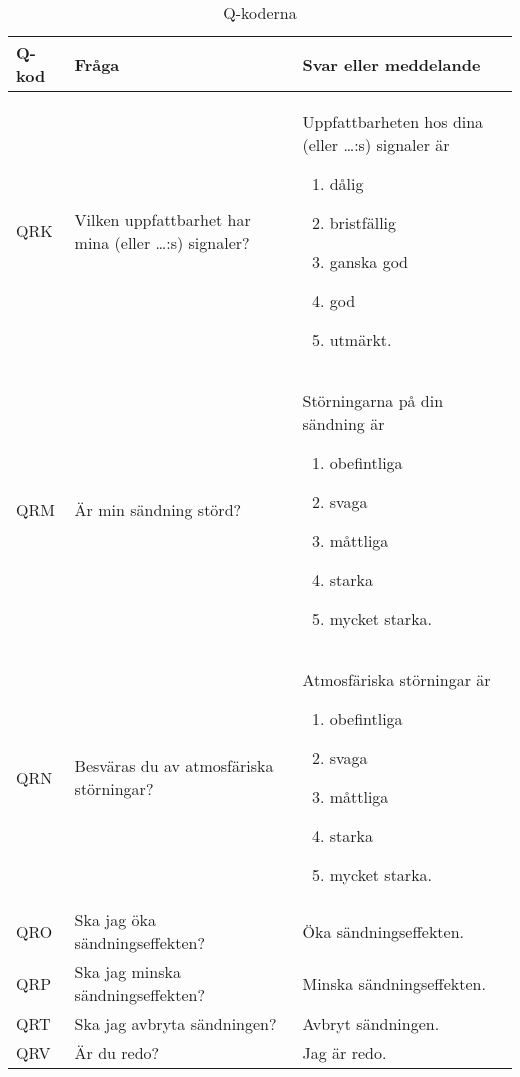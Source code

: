 \begin{table}
  \label{tab:q-kod}
  \caption{Q-koderna}
  \begin{tabular}{lp{6cm}p{6cm}}
    Q-kod & Fråga & Svar eller meddelande \\
    \hline
    QRK &
    Vilken uppfattbarhet har mina (eller \dots:s) signaler?
    &
    Uppfattbarheten hos dina (eller \dots:s) signaler är
    \vspace{-\topsep}
    \begin{enumerate}[noitemsep]
    \item dålig
    \item bristfällig
    \item ganska god
    \item god
    \item utmärkt.
    \end{enumerate} \\
    QRM &
    Är min sändning störd?
    &
    Störningarna på din sändning är
    \vspace{-\topsep}
    \begin{enumerate}[noitemsep]
    \item obefintliga
    \item svaga
    \item måttliga
    \item starka
    \item mycket starka.
    \end{enumerate} \\
    QRN
    &
    Besväras du av atmosfäriska störningar?
    &
    Atmosfäriska störningar är
    \vspace{-\topsep}
    \begin{enumerate}[noitemsep]
    \item obefintliga
    \item svaga
    \item måttliga
    \item starka
    \item mycket starka.
    \end{enumerate} \\
    QRO
    &
    Ska jag öka sändningseffekten?
    &
    Öka sändningseffekten.
    \\
    QRP
    &
    Ska jag minska sändningseffekten?
    &
    Minska sändningseffekten.
    \\
    QRT
    &
    Ska jag avbryta sändningen?
    &
    Avbryt sändningen.
    \\
    QRV
    &
    Är du redo?
    &
    Jag är redo.

\end{tabular}
\end{table}
